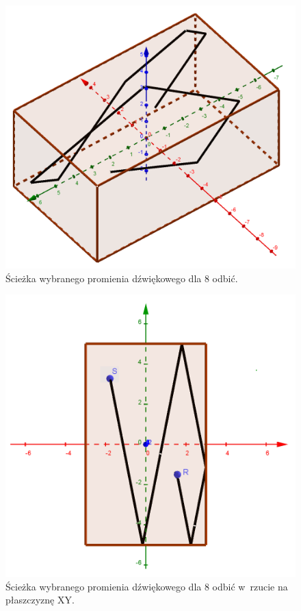 \begin{figure}[h]
        \centering
                \centering
                \includegraphics[width=12cm]{odbicia}
	\caption{Ścieżka wybranego promienia dźwiękowego dla 8 odbić.}
\end{figure}

\begin{figure}[h]
        \centering
                \centering
                \includegraphics[width=12cm]{odbiciaz}
	\caption{Ścieżka wybranego promienia dźwiękowego dla 8 odbić w~rzucie na płaszczyznę XY.}
\end{figure}

